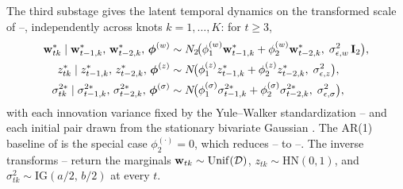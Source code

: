 \documentclass[12pt]{article}
\begin{document}
The third substage gives the latent temporal dynamics on the transformed scale
of --, independently across knots
$k = 1, \ldots, K$: for $t \ge 3$,
\begin{align}
  \mbox{\bf w}^*_{tk} \mid \mbox{\bf w}^*_{t-1,k},\, \mbox{\bf w}^*_{t-2,k},\, \mbox{\boldmath $\phi$}^{(w)}
    &\sim N_2\!\big(\phi^{(w)}_1 \mbox{\bf w}^*_{t-1,k} + \phi^{(w)}_2 \mbox{\bf w}^*_{t-2,k},\;
                    \sigma^2_{\epsilon,w}\, \mbox{\bf I}_2\big),
    \label{eq:stage2-w}\\
  z^*_{tk} \mid z^*_{t-1,k},\, z^*_{t-2,k},\, \mbox{\boldmath $\phi$}^{(z)}
    &\sim N\!\big(\phi^{(z)}_1 z^*_{t-1,k} + \phi^{(z)}_2 z^*_{t-2,k},\;
                  \sigma^2_{\epsilon,z}\big),
    \label{eq:stage2-z}\\
  \sigma^{2*}_{tk} \mid \sigma^{2*}_{t-1,k},\, \sigma^{2*}_{t-2,k},\, \mbox{\boldmath $\phi$}^{(\sigma)}
    &\sim N\!\big(\phi^{(\sigma)}_1 \sigma^{2*}_{t-1,k}
                  + \phi^{(\sigma)}_2 \sigma^{2*}_{t-2,k},\;
                  \sigma^2_{\epsilon,\sigma}\big),
    \label{eq:stage2-sigma}
\end{align}
with each innovation variance fixed by the Yule--Walker standardization
-- and each initial pair drawn from the
stationary bivariate Gaussian .  The AR(1) baseline of
\textcite{morris_space-time_2017} is the special case $\phi^{(\cdot)}_2 = 0$,
which reduces -- to
--.  The inverse transforms
-- return the marginals
$\mbox{\bf w}_{tk} \sim \mathrm{Unif}({\cal D})$, $z_{tk} \sim \mathrm{HN}(0,1)$, and
$\sigma^2_{tk} \sim \mathrm{IG}(a/2,\, b/2)$ at every $t$.
\end{document}
